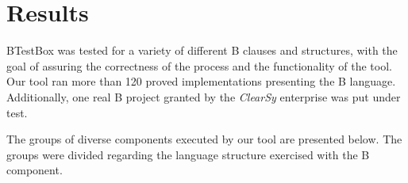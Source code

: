\documentclass[runningheads]{llncs}
\begin{document}
\section{Results} \label{sec:Results}


BTestBox was tested for a variety of different B clauses and structures, with the goal of assuring the correctness of the process and the functionality of the tool. Our tool ran more than 120 proved implementations presenting the B language. Additionally, one real B project granted by the \textit{ClearSy} enterprise was put under test.

The groups of diverse components executed by our tool are presented below. The groups were divided regarding the language structure exercised with the B component.

\end{document}
